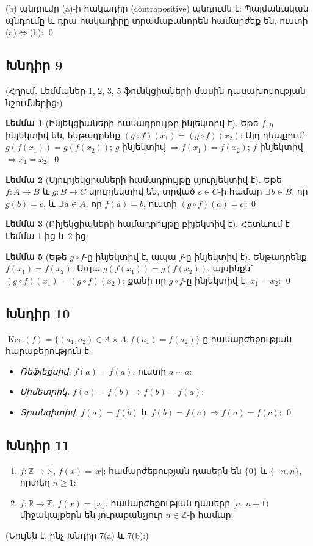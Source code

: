 (b) պնդումը (a)-ի հակադիր (contrapositive) պնդումն է: Պայմանական պնդումը և դրա հակադիրը տրամաբանորեն համարժեք են, ուստի (a)$\Leftrightarrow$(b): \qed

\subsection*{Խնդիր 9}
(Հղում. Լեմմաներ 1, 2, 3, 5 ֆունկցիաների մասին դասախոսության նշումներից:)

\textbf{Լեմմա 1} (Ինյեկցիաների համադրույթը ինյեկտիվ է). Եթե $f,g$ ինյեկտիվ են, ենթադրենք $(g\circ f)(x_1)=(g\circ f)(x_2)$: Այդ դեպքում՝ $g(f(x_1))=g(f(x_2))$; $g$ ինյեկտիվ $\Rightarrow f(x_1)=f(x_2)$; $f$ ինյեկտիվ $\Rightarrow x_1=x_2$: \qed

\textbf{Լեմմա 2} (Սյուրյեկցիաների համադրույթը սյուրյեկտիվ է). Եթե $f:A\to B$ և $g:B\to C$ սյուրյեկտիվ են, տրված $c\in C$-ի համար $\exists\, b\in B$, որ $g(b)=c$, և $\exists\, a\in A$, որ $f(a)=b$, ուստի $(g\circ f)(a)=c$: \qed

\textbf{Լեմմա 3} (Բիյեկցիաների համադրույթը բիյեկտիվ է). Հետևում է Լեմմա 1-ից և 2-ից:

\textbf{Լեմմա 5} (Եթե $g\circ f$-ը ինյեկտիվ է, ապա $f$-ը ինյեկտիվ է). Ենթադրենք $f(x_1)=f(x_2)$: Ապա $g(f(x_1))=g(f(x_2))$, այսինքն՝ $(g\circ f)(x_1)=(g\circ f)(x_2)$; քանի որ $g\circ f$-ը ինյեկտիվ է, $x_1=x_2$: \qed

\subsection*{Խնդիր 10}
$\operatorname{Ker}(f) = \{(a_1,a_2)\in A\times A : f(a_1)=f(a_2)\}$-ը համարժեքության հարաբերություն է.
\begin{itemize}[nosep]
  \item \emph{Ռեֆլեքսիվ.} $f(a)=f(a)$, ուստի $a\sim a$:
  \item \emph{Սիմետրիկ.} $f(a)=f(b)\Rightarrow f(b)=f(a)$:
  \item \emph{Տրանզիտիվ.} $f(a)=f(b)$ և $f(b)=f(c)\Rightarrow f(a)=f(c)$: \qed
\end{itemize}

\subsection*{Խնդիր 11}
\begin{enumerate}[label=(\alph*), nosep]
  \item $f:\mathbb{Z}\to\mathbb{N}$, $f(x)=|x|$:\; համարժեքության դասերն են $\{0\}$ և $\{-n,n\}$, որտեղ $n\geq 1$:
  \item $f:\mathbb{R}\to\mathbb{Z}$, $f(x)=\lfloor x\rfloor$:\; համարժեքության դասերը $[n,\,n+1)$ միջակայքերն են յուրաքանչյուր $n\in\mathbb{Z}$-ի համար:
\end{enumerate}
(Նույնն է, ինչ Խնդիր 7(a) և 7(b):)

